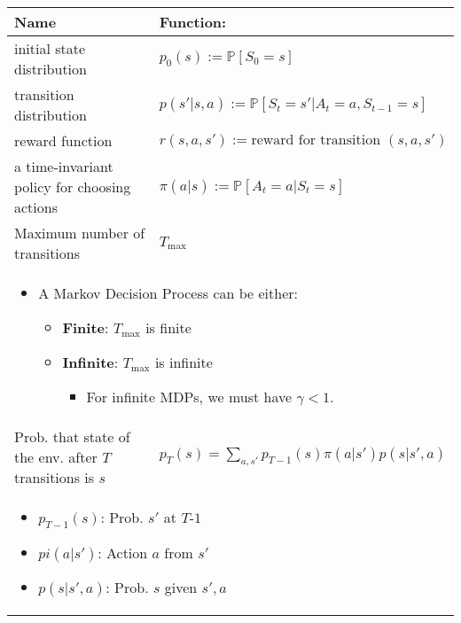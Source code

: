 \begin{summary}
    \begin{center}
        \begin{tabular}{ll}
            \toprule
            \textbf{Name} & \textbf{Function:} \\
            \midrule
            initial state distribution & $p_0(s) := \mathbb{P}[S_0 = s]$ \\
            \midrule
            transition distribution & $p(s'|s, a) := \mathbb{P}[S_t = s' | A_t = a, S_{t-1} = s]$ \\
            \midrule
            reward function & $r(s, a, s') := \text{reward for transition } (s, a, s')$ \\
            \midrule
            a time-invariant policy for choosing actions & $\pi(a|s) := \mathbb{P}[A_t = a | S_t = s]$ \\
            \midrule
            Maximum number of transitions & $T_{\max}$ \\
            \multicolumn{2}{p{\linewidth}}{
            \begin{itemize}
                \item A Markov Decision Process can be either:
                \begin{itemize}
                    \item \textbf{Finite}: $T_{\max}$ is finite
                    \item \textbf{Infinite}: $T_{\max}$ is infinite
                    \begin{itemize}
                        \item For infinite MDPs, we must have $\gamma < 1$.
                    \end{itemize}
                \end{itemize}
            \end{itemize}} \\
            \midrule
            Prob. that state of the env. after $T$ transitions is $s$ & $p_T(s) = \sum_{a,s'} p_{T-1}(s) \pi(a|s') p(s|s',a)$ \\
            \multicolumn{2}{p{\linewidth}}{
            \begin{itemize}
                \item $p_{T-1}(s)$: Prob. $s'$ at $T$-$1$
                \item $pi(a|s')$: Action $a$ from $s'$
                \item $p(s|s',a)$: Prob. $s$ given $s',a$
            \end{itemize}} \\

\end{tabular}
\end{center}
\end{summary}
